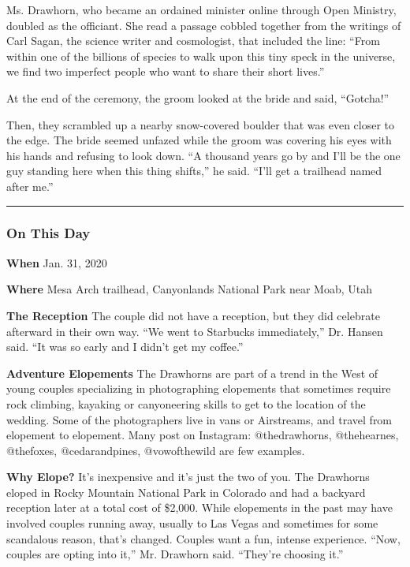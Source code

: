 Ms. Drawhorn, who became an ordained minister online through Open
Ministry, doubled as the officiant. She read a passage cobbled together
from the writings of Carl Sagan, the science writer and cosmologist,
that included the line: ``From within one of the billions of species to
walk upon this tiny speck in the universe, we find two imperfect people
who want to share their short lives.''

At the end of the ceremony, the groom looked at the bride and said,
``Gotcha!''

Then, they scrambled up a nearby snow-covered boulder that was even
closer to the edge. The bride seemed unfazed while the groom was
covering his eyes with his hands and refusing to look down. ``A thousand
years go by and I'll be the one guy standing here when this thing
shifts,'' he said. ``I'll get a trailhead named after me.''

\begin{center}\rule{0.5\linewidth}{\linethickness}\end{center}

\hypertarget{on-this-day}{%
\subsubsection{On This Day}\label{on-this-day}}

\textbf{When} Jan. 31, 2020

\textbf{Where} Mesa Arch trailhead, Canyonlands National Park near Moab,
Utah

\textbf{The Reception} The couple did not have a reception, but they did
celebrate afterward in their own way. ``We went to Starbucks
immediately,'' Dr. Hansen said. ``It was so early and I didn't get my
coffee.''

\textbf{Adventure Elopements} The Drawhorns are part of a trend in the
West of young couples specializing in photographing elopements that
sometimes require rock climbing, kayaking or canyoneering skills to get
to the location of the wedding. Some of the photographers live in vans
or Airstreams, and travel from elopement to elopement. Many post on
Instagram: @thedrawhorns, @thehearnes, @thefoxes, @cedarandpines,
@vowofthewild are few examples.

\textbf{Why Elope?} It's inexpensive and it's just the two of you. The
Drawhorns eloped in Rocky Mountain National Park in Colorado and had a
backyard reception later at a total cost of \$2,000. While elopements in
the past may have involved couples running away, usually to Las Vegas
and sometimes for some scandalous reason, that's changed. Couples want a
fun, intense experience. ``Now, couples are opting into it,'' Mr.
Drawhorn said. ``They're choosing it.''

